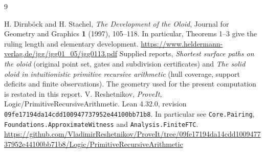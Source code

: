 \documentclass[10pt,letterpaper]{article}
\begin{document}

\begin{thebibliography}{9}\small\raggedright
{} H. Dirnböck and H. Stachel, \emph{The Development of the Oloid}, Journal for Geometry and Graphics \textbf{1} (1997), 105--118. In particular, Theorems 1--3 give the ruling length and elementary development.
\url{https://www.heldermann-verlag.de/jgg/jgg01_05/jgg0113.pdf}
 Supplied reports, \emph{Shortest surface paths on the oloid} (original point set, gates and subdivision certificates) and \emph{The solid oloid in intuitionistic primitive recursive arithmetic} (hull coverage, support deficits and finite observations). The geometry used for the present computation is restated in this report.
 V. Reshetnikov, \emph{ProveIt}, Logic/PrimitiveRecursiveArithmetic. Lean 4.32.0, revision \texttt{09fe17194da14cdd100947737952e44100bb71b8}. In particular see \texttt{Core.Pairing}, \texttt{Foundations.ApproximateWitness} and \texttt{Analysis.FiniteFTC}.
\url{https://github.com/VladimirReshetnikov/ProveIt/tree/09fe17194da14cdd100947737952e44100bb71b8/Logic/PrimitiveRecursiveArithmetic}
\end{thebibliography}
\end{document}
